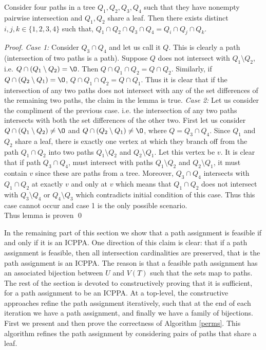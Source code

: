 \documentclass{llncs}
\begin{document}
\begin{lemma}
  \label{lem:fourpaths} Consider four paths in a tree $Q_1, Q_2, Q_3,
  Q_4$ such that they have nonempty pairwise intersection and $Q_1,
  Q_2$ share a leaf. Then there exists distinct $i, j, k \in \{1,2,3,4\}$ such that, $Q_1 \cap Q_2 \cap Q_3 \cap Q_4 = Q_i \cap
  Q_j \cap Q_k$.
\end{lemma}
\begin{proof}
  {\em Case 1:} Consider $Q_3 \cap Q_4$ and let us call it $Q$. This is clearly a
  path (intersection of two paths is a path). 
  Suppose $Q$
  does not intersect with $Q_1 \setminus Q_2$, i.e. $Q \cap (Q_1
  \setminus Q_2) = \O$. Then $Q \cap
  Q_1 \cap Q_2 = Q \cap Q_2$. Similarly, if $Q \cap (Q_2 \setminus
  Q_1) = \O$, $Q \cap Q_1 \cap Q_2 = Q \cap Q_1$. Thus it is
  clear that if the intersection of any two paths does not intersect
  with any of the set differences of the remaining two paths, the
  claim in the lemma is true. 
  {\em Case 2:} Let us consider the compliment of the previous case. i.e. the
  intersection of any two paths intersects with both the set
  differences of the other two. First let us consider $Q \cap (Q_1 \setminus Q_2) \ne
  \O$ and $Q \cap (Q_2 \setminus Q_1) \ne \O$, where $Q = Q_3 \cap
  Q_4$. Since $Q_1$ and
  $Q_2$ share a leaf, there is exactly one vertex at which they branch
  off from the path $Q_1 \cap Q_2$ into two paths $Q_1 \setminus Q_2$
  and $Q_2 \setminus Q_1$. Let this vertex be $v$. It is clear that if
  path $Q_3 \cap Q_4$, must intersect with paths $Q_1 \setminus Q_2$
  and $Q_2 \setminus Q_1$, it must contain $v$ since these are paths
  from a tree. Moreover, $Q_3 \cap Q_4$ intersects with $Q_1 \cap
  Q_2$ at exactly $v$ and only at $v$ which means that $Q_1 \cap Q_2$
  does not intersect with $Q_3 \setminus Q_4$ or $Q_4 \setminus Q_3$
  which contradicts initial condition of this case. Thus this
  case cannot occur and case 1 is the only possible scenario. \\
  Thus lemma is proven \qed
\end{proof}


\noindent
In the remaining part of this section we show that a path assignment is feasible if and only if
it is an ICPPA.  One direction of this claim is clear: that if a path assignment is feasible, then all
intersection cardinalities are preserved, that is the path assignment is an ICPPA.  The reason is that a
feasible path assignment has an associated bijection between $U$ and $V(T)$ such that the sets
map to paths.  The rest of the section is devoted to constructively proving that it is sufficient, for a path
assignment to be an ICPPA.  At a top-level, the constructive approaches refine the path assignment iteratively, such that at the end of each iteration we have a path assignment, and finally we have a family of bijections.
First we present and then prove the
  correctness of Algorithm \ref{perms}.  This algorithm refines the path assignment by considering pairs of paths that share a leaf.  
\end{document}
